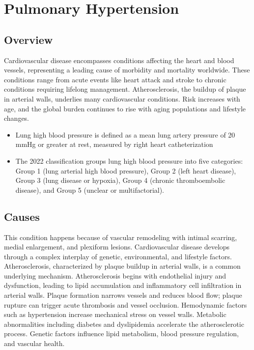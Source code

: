 \chapter{Pulmonary Hypertension}
\label{sec:Pulmonary Hypertension}

\section{Overview}
Cardiovascular disease encompasses conditions affecting the heart and blood vessels, representing a leading cause of morbidity and mortality worldwide. These conditions range from acute events like heart attack and stroke to chronic conditions requiring lifelong management. Atherosclerosis, the buildup of plaque in arterial walls, underlies many cardiovascular conditions. Risk increases with age, and the global burden continues to rise with aging populations and lifestyle changes.

\begin{itemize}[noitemsep]
  \item Lung high blood pressure is defined as a mean lung artery pressure of 20 mmHg or greater at rest, measured by right heart catheterization
  \item The 2022 classification groups lung high blood pressure into five categories: Group 1 (lung arterial high blood pressure), Group 2 (left heart disease), Group 3 (lung disease or hypoxia), Group 4 (chronic thromboembolic disease), and Group 5 (unclear or multifactorial).
\end{itemize}
\section{Causes}
This condition happens because of vascular remodeling with intimal scarring, medial enlargement, and plexiform lesions. Cardiovascular disease develops through a complex interplay of genetic, environmental, and lifestyle factors. Atherosclerosis, characterized by plaque buildup in arterial walls, is a common underlying mechanism. Atherosclerosis begins with endothelial injury and dysfunction, leading to lipid accumulation and inflammatory cell infiltration in arterial walls. Plaque formation narrows vessels and reduces blood flow; plaque rupture can trigger acute thrombosis and vessel occlusion. Hemodynamic factors such as hypertension increase mechanical stress on vessel walls. Metabolic abnormalities including diabetes and dyslipidemia accelerate the atherosclerotic process. Genetic factors influence lipid metabolism, blood pressure regulation, and vascular health.
